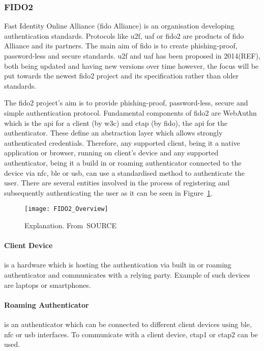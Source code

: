 \subsubsection{FIDO2}

Fast Identity Online Alliance (\acrshort{fido} Alliance) is an organisation developing authentication standards. Protocols like \acrfull{u2f}, \acrfull{uaf} or \acrshort{fido}2 are products of \acrshort{fido} Alliance and its partners. The main aim of \acrshort{fido} is to create phishing-proof, password-less and secure standards. \acrshort{u2f} and \acrshort{uaf} has been proposed in 2014(REF), both being updated and having new versions over time however, the focus will be put towards the newest \acrshort{fido}2 project and its specification rather than older standards.

The \acrshort{fido}2 project’s aim is to provide phishing-proof, password-less, secure and simple authentication protocol. Fundamental components of \acrshort{fido}2 are WebAuthn which is the \acrshort{api} for a client (by \acrshort{w3c}) and \acrshort{ctap} (by \acrshort{fido}), the \acrshort{api} for the authenticator. These define an abstraction layer which allows strongly authenticated credentials. Therefore, any supported client, being it a native application or browser, running on client’s device and any supported authenticator, being it a build in or roaming authenticator connected to the device via \acrshort{nfc}, \acrshort{ble} or \acrshort{usb}, can use a standardised method to authenticate the user. There are several entities involved in the process of registering and subsequently authenticating the user as it can be seen in Figure~\ref{fig:fido2_overview}.

\begin{figure}[ht]
    \centering
    \texttt{[image: FIDO2\_Overview]}
    \caption{Explanation. From~\cite{}SOURCE}
    \label{fig:fido2_overview}
\end{figure}

\paragraph{Client Device} 
is a hardware which is hosting the authentication via built in or roaming authenticator and communicates with a relying party. Example of such devices are laptops or smartphones. 

\paragraph{Roaming Authenticator} 
is an authenticator which can be connected to different client devices using \acrshort{ble}, \acrshort{nfc} or \acrshort{usb} interfaces. To communicate with a client device, \acrshort{ctap}1 or \acrshort{ctap}2 can be used.

